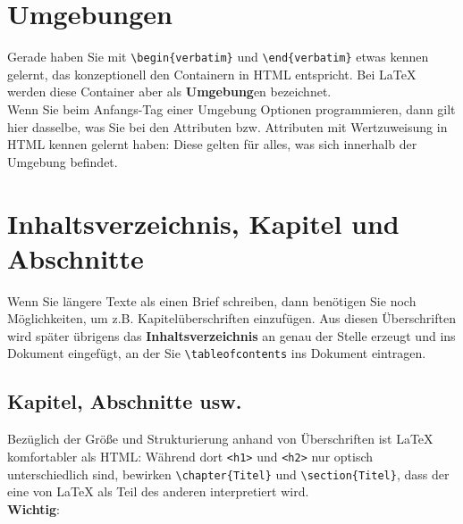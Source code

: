 \section{Umgebungen}

Gerade haben Sie mit \verb|\begin{verbatim}| und \verb|\end{verbatim}| etwas kennen gelernt, das konzeptionell den Containern in HTML entspricht. Bei LaTeX werden diese Container aber als \textbf{Umgebung}en bezeichnet.\\

Wenn Sie beim Anfangs-\glqq{}Tag\grqq{} einer Umgebung Optionen programmieren, dann gilt hier dasselbe, was Sie bei den Attributen bzw. Attributen mit Wertzuweisung in HTML kennen gelernt haben: Diese gelten für alles, was sich innerhalb der Umgebung befindet.

\section{Inhaltsverzeichnis, Kapitel und Abschnitte}

Wenn Sie längere Texte als einen Brief schreiben, dann benötigen Sie noch Möglichkeiten, um z.B. Kapitelüberschriften einzufügen. Aus diesen Überschriften wird später übrigens das \textbf{Inhaltsverzeichnis} an genau der Stelle erzeugt und ins Dokument eingefügt, an der Sie \verb|\tableofcontents| ins Dokument eintragen.

\subsection{Kapitel, Abschnitte usw.}

Bezüglich der Größe und Strukturierung anhand von Überschriften ist LaTeX komfortabler als HTML: Während dort \verb|<h1>| und \verb|<h2>| nur optisch unterschiedlich sind, bewirken \verb|\chapter{Titel}| und \verb|\section{Titel}|, dass der eine von LaTeX als Teil des anderen interpretiert wird.\\

\textbf{Wichtig}:\\


